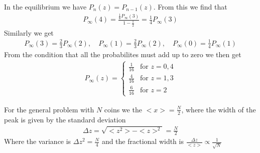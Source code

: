 In the equilibrium we have $P_n(z) = P_{n-1}(z)$. From this we find that
\begin{align*}
	P_{\infty}(4) = \frac{\frac{1}{8}P_{\infty}(3)}{1 - \frac{1}{2}} = 	 \frac{1}{4} P_{\infty}(3)
\end{align*}
Similarly we get
\begin{align*}
	P_{\infty}(3) = \frac{2}{3} P_{\infty}(2), \quad P_{\infty}(1) = \frac{2}{3} P_{\infty}(2), \quad P_{\infty}(0) = \frac{1}{4} P_{\infty}(1)
\end{align*}
From the condition that all the probabilites must add up to zero we then get
\begin{align*}
	P_{\infty}(z) = \left\{\begin{array}{ll}
		\frac{1}{16} & \text{for } z = 0,4 \\
		\frac{4}{16} & \text{for } z = 1,3\\
		\frac{6}{16} & \text{for } z = 2
	\end{array} \right.
\end{align*}

For the general problem with $N$ coins we the $<x> = \frac{N}{2}$, where the width of the peak is given by the standard deviation
\begin{align*}
	\Delta z = \sqrt{<z^2> - <z>^2} = \frac{N}{2}
\end{align*}
Where the variance is $\Delta z^2 = \frac{N}{4}$ and the fractional width is $\frac{\Delta z}{<z>} \propto \frac{1}{\sqrt{N}}$\\

